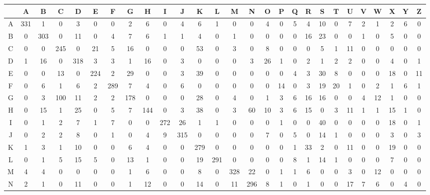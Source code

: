 \documentclass[11pt, oneside]{article}    %
\begin{document}
\begingroup
\fontsize{9pt}{9pt}\selectfont
\begin{landscape}
\begin{tabular}{|c|c|c|c|c|c|c|c|c|c|c|c|c|c|c|c|c|c|c|c|c|c|c|c|c|c|c|}
  \hline
  & A & B & C & D & E & F & G & H & I & J & K & L & M & N & O & P & Q & R & S & T & U & V & W & X & Y & Z \\ \hline  
  A & 331 & 1 & 0 & 3 & 0 & 0 & 2 & 6 & 0 & 4 & 6 & 1 & 0 & 0 & 4 & 0 & 5 & 4 & 10 & 0 & 7 & 2 & 1 & 2 & 6 & 0 \\ \hline
  B & 0 & 303 & 0 & 11 & 0 & 4 & 7 & 6 & 1 & 1 & 4 & 0 & 1 & 0 & 0 & 0 & 0 & 16 & 23 & 0 & 0 & 1 & 0 & 5 & 0 & 0 \\ \hline
  C & 0 & 0 & 245 & 0 & 21 & 5 & 16 & 0 & 0 & 0 & 53 & 0 & 3 & 0 & 8 & 0 & 0 & 0 & 5 & 1 & 11 & 0 & 0 & 0 & 0 & 0 \\ \hline
  D & 1 & 16 & 0 & 318 & 3 & 3 & 1 & 16 & 0 & 3 & 0 & 0 & 0 & 3 & 26 & 1 & 0 & 2 & 1 & 2 & 2 & 0 & 0 & 4 & 0 & 1 \\ \hline
  E & 0 & 0 & 13 & 0 & 224 & 2 & 29 & 0 & 0 & 3 & 39 & 0 & 0 & 0 & 0 & 0 & 4 & 3 & 30 & 8 & 0 & 0 & 0 & 18 & 0 & 11 \\ \hline
  F & 0 & 6 & 1 & 6 & 2 & 289 & 7 & 4 & 0 & 6 & 0 & 0 & 0 & 0 & 0 & 14 & 0 & 3 & 19 & 20 & 1 & 0 & 2 & 1 & 6 & 1 \\ \hline
  G & 0 & 3 & 100 & 11 & 2 & 2 & 178 & 0 & 0 & 0 & 28 & 0 & 4 & 0 & 1 & 3 & 6 & 16 & 16 & 0 & 0 & 4 & 12 & 1 & 0 & 0 \\ \hline
  H & 0 & 15 & 1 & 25 & 0 & 5 & 7 & 144 & 0 & 3 & 38 & 0 & 3 & 60 & 10 & 3 & 6 & 15 & 0 & 3 & 11 & 1 & 1 & 15 & 1 & 0 \\ \hline
  I & 0 & 1 & 2 & 7 & 1 & 7 & 0 & 0 & 272 & 26 & 1 & 1 & 0 & 0 & 0 & 1 & 0 & 0 & 40 & 0 & 0 & 0 & 0 & 18 & 0 & 1 \\ \hline
  J & 0 & 2 & 2 & 8 & 0 & 1 & 0 & 4 & 9 & 315 & 0 & 0 & 0 & 0 & 7 & 0 & 5 & 0 & 14 & 1 & 0 & 0 & 0 & 3 & 0 & 3 \\ \hline
  K & 1 & 3 & 1 & 10 & 0 & 0 & 6 & 4 & 0 & 0 & 279 & 0 & 0 & 0 & 0 & 0 & 1 & 33 & 2 & 0 & 11 & 0 & 0 & 19 & 0 & 0 \\ \hline
  L & 0 & 1 & 5 & 15 & 5 & 0 & 13 & 1 & 0 & 0 & 19 & 291 & 0 & 0 & 0 & 0 & 8 & 1 & 14 & 1 & 0 & 0 & 0 & 7 & 0 & 0 \\ \hline
  M & 4 & 4 & 0 & 0 & 0 & 0 & 1 & 6 & 0 & 0 & 8 & 0 & 328 & 22 & 0 & 1 & 1 & 6 & 0 & 0 & 3 & 0 & 12 & 0 & 0 & 0 \\ \hline
  N & 2 & 1 & 0 & 11 & 0 & 0 & 1 & 12 & 0 & 0 & 14 & 0 & 11 & 296 & 8 & 1 & 0 & 1 & 0 & 0 & 17 & 7 & 6 & 0 & 4 & 0 \\ \hline

\end{tabular}
\end{landscape}
\end{document}
